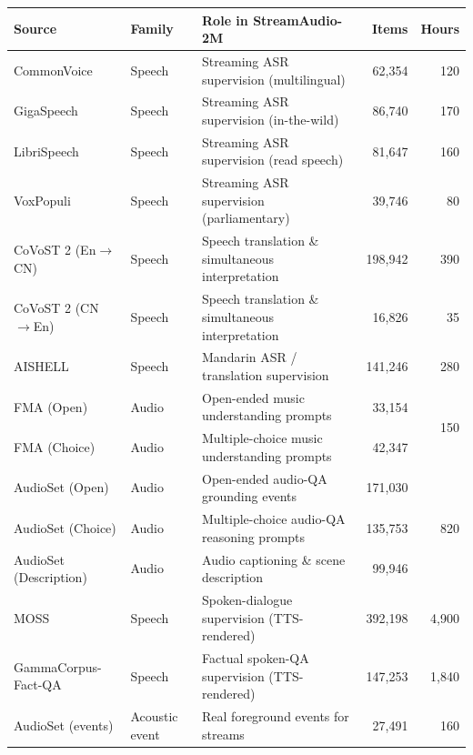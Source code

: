 \documentclass{llmxive}
\providecommand{\arraystretch}{1.0}
\begin{document}
\begin{table}[!htbp]
\centering
\small
\setlength{\tabcolsep}{4pt}
\renewcommand{\arraystretch}{1.05}
\begin{tabularx}{\linewidth}{@{}l l X r r@{}}
\toprule
\textbf{Source} & \textbf{Family} & \textbf{Role in StreamAudio-2M} & \textbf{Items} & \textbf{Hours} \\
\midrule
CommonVoice           & Speech         & Streaming ASR supervision (multilingual)          & 62{,}354  & 120 \\
GigaSpeech            & Speech         & Streaming ASR supervision (in-the-wild)           & 86{,}740  & 170 \\
LibriSpeech           & Speech         & Streaming ASR supervision (read speech)           & 81{,}647  & 160 \\
VoxPopuli             & Speech         & Streaming ASR supervision (parliamentary)         & 39{,}746  & 80  \\
\midrule
CoVoST 2 (En$\to$CN)  & Speech         & Speech translation \& simultaneous interpretation & 198{,}942 & 390 \\
CoVoST 2 (CN$\to$En)  & Speech         & Speech translation \& simultaneous interpretation & 16{,}826  & 35  \\
AISHELL               & Speech         & Mandarin ASR / translation supervision            & 141{,}246 & 280 \\
\midrule
FMA (Open)            & Audio          & Open-ended music understanding prompts            & 33{,}154  & \multirow{2}{*}{150} \\
FMA (Choice)          & Audio          & Multiple-choice music understanding prompts       & 42{,}347  &     \\
AudioSet (Open)       & Audio          & Open-ended audio-QA grounding events              & 171{,}030 & \multirow{3}{*}{820} \\
AudioSet (Choice)     & Audio          & Multiple-choice audio-QA reasoning prompts        & 135{,}753 &     \\
AudioSet (Description)& Audio          & Audio captioning \& scene description             & 99{,}946  &     \\
\midrule
MOSS                  & Speech         & Spoken-dialogue supervision (TTS-rendered)        & 392{,}198 & 4{,}900 \\
GammaCorpus-Fact-QA   & Speech         & Factual spoken-QA supervision (TTS-rendered)      & 147{,}253 & 1{,}840 \\
\midrule
AudioSet (events)     & Acoustic event & Real foreground events for streams                & 27{,}491  & \multirow{3}{*}{160} \\

\end{tabularx}
\end{table}
\end{document}
